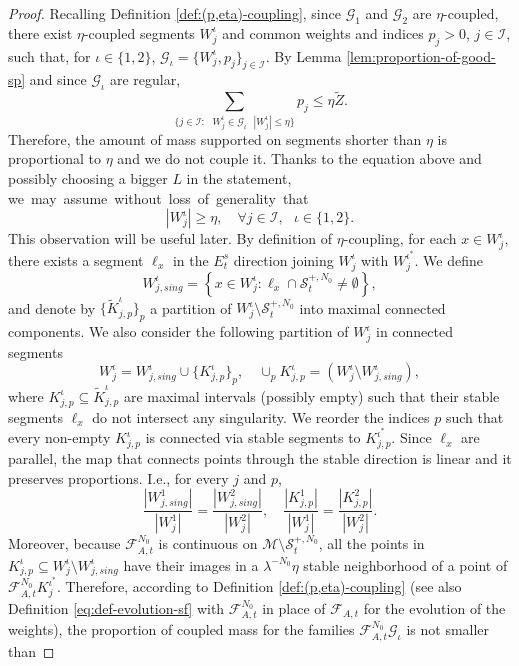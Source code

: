 \documentclass{amsart}
\numberwithin{equation}{section}
\renewcommand{\ge}{\geqslant}
\renewcommand{\le}{\leqslant}
\newcommand\cF{{\mathcal F}}
\newcommand\cG{{\mathcal G}}
\newcommand\cI{{\mathcal I}}
\newcommand\cM{{\mathcal M}}
\newcommand\cS{{\mathcal S}}
\newcommand{\catt}{\cF_{A,t}}
\begin{document}
\begin{proof}
Recalling Definition \ref{def:(p,eta)-coupling}, since \(\cG_1\) and \(\cG_2\) are \(\eta\)-coupled, there exist \(\eta\)-coupled segments \(W^{\iota}_j\) and common weights and indices \(p_j >0\), \(j \in \cI\), such that, for \(\iota \in \{1,2\}\), \(\cG_{\iota} = \{W^{\iota}_j, p_j\}_{j \in \cI}\). By Lemma \ref{lem:proportion-of-good-sp} and since \(\cG_{\iota}\) are regular, 
\[
\sum_{\{j \in \cI: \text{ } W^{\iota}_j \in \cG_{\iota} \text{ }|W^{\iota}_j| \le \eta \}}p_j \le \eta \widetilde Z.
\]
Therefore, the amount of mass supported on segments shorter than \(\eta\) is proportional to \(\eta\) and we do not couple it. Thanks to the equation above and possibly choosing a bigger \(L\) in the statement, \mbox{we may assume without loss of generality that}
\begin{equation}\label{eq:miminal-length-for-coupling}
  |W^{\iota}_j| \ge \eta, \quad \forall j \in \cI, \text{ }\iota \in \{1,2\}.
\end{equation}
This observation will be useful later. By definition of \(\eta\)-coupling, for each \(x \in W^\iota_j\), there exists a segment \(\ell_x\) in the \(E^s_t\) direction joining \(W^\iota_j\) with \(W^{\iota^*}_j\). We define
\[
     W_{j,sing}^\iota = \left\{ x \in W^\iota_j: \ell_x \cap \cS_t^{+,N_0} \neq \emptyset \right\},
\]
and denote by \(\{\widetilde K^{\iota}_{j,p}\}_p\) a partition of \(W^{\iota}_{j} \setminus \cS_t^{+,N_0}\) into maximal connected components. We also consider the following partition of \(W^{\iota}_j\) in connected segments
\[
W^{\iota}_j = W^{\iota}_{j,sing} \cup \{K_{j,p}^{\iota}\}_p, \quad \cup_{p} K_{j,p}^{\iota} = (W^{\iota}_j \setminus W^{\iota}_{j,sing}),
\]
where \(K_{j,p}^{\iota}\subseteq \widetilde K_{j,p}^{\iota}\) are maximal intervals (possibly empty) such that their stable segments \(\ell_x\) do not intersect any singularity. We reorder the indices \(p\) such that every non-empty \(K^{\iota}_{j,p}\) is connected via stable segments to \(K^{\iota^{*}}_{j,p}\). Since \(\ell_x\) are parallel, the map that connects points through the stable direction is linear and it preserves proportions. I.e., for every \(j\) and \(p\),
\begin{equation}\label{eq:talete}
    \frac{|W^{1}_{j,sing}|}{|W^1_j|} =  \frac{|W^{2}_{j,sing}|}{|W^2_j|}, \quad \frac{|K_{j,p}^1|}{|W^{1}_j|} = \frac{|K_{j,p}^2|}{|W^{2}_j|}.
\end{equation}
Moreover, because \(\catt^{N_0}\) is continuous on \(\cM \setminus \cS_t^{+,N_0}\), all the points in \( K_{j,p}^{\iota} \subseteq  W_{j}^\iota \setminus  W_{j,sing}^\iota\) have their images in a \(\lambda^{-N_0}\eta\) stable neighborhood of a point of \(\catt^{N_0}K^{\iota^*}_j\). Therefore, according to Definition \ref{def:(p,eta)-coupling} (see also Definition \ref{eq:def-evolution-sf} with \(\catt^{N_0}\) in place of \(\catt\) for the evolution of the weights), the proportion of coupled mass for the families \(\catt^{N_0}\cG_{\iota}\) is not smaller than

\end{proof}
\end{document}
